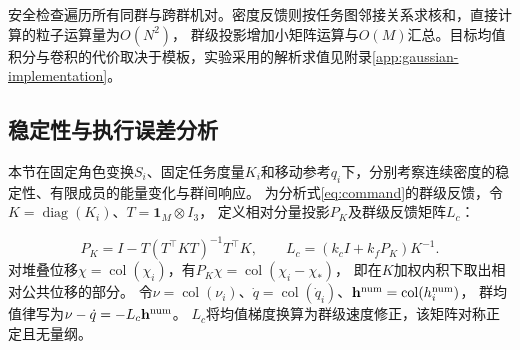\documentclass[UTF8,a4paper,11pt,fontset=none]{ctexart}
\newcommand{\diag}{\operatorname{diag}}\newcommand{\col}{\operatorname{col}}
\begin{document}
\begin{center}\end{center}
安全检查遍历所有同群与跨群机对。密度反馈则按任务图邻接关系求核和，直接计算的粒子运算量为$O(N^2)$，
群级投影增加小矩阵运算与$O(M)$汇总。目标均值积分与卷积的代价取决于模板，实验采用的解析求值见附录\ref{app:gaussian-implementation}。

\subsection{稳定性与执行误差分析}\label{sec:nominal-properties}\label{sec:execution-errors}\label{sec:formation-response}
本节在固定角色变换$S_i$、固定任务度量$K_i$和移动参考$q_i$下，分别考察连续密度的稳定性、有限成员的能量变化与群间响应。
为分析式\eqref{eq:command}的群级反馈，令$K=\diag(K_i)$、$T=\mathbf1_M\otimes I_3$，
定义相对分量投影$P_K$及群级反馈矩阵$L_c$：

\begin{equation}
P_K=I-T(T^\top KT)^{-1}T^\top K,\qquad
L_c=(k_cI+k_fP_K)K^{-1}.
\label{eq:mobility}
\end{equation}
对堆叠位移$\chi=\col(\chi_i)$，有$P_K\chi=\col(\chi_i-\chi_*)$，
即在$K$加权内积下取出相对公共位移的部分。
令$\nu=\col(\nu_i)$、$\dot q=\col(\dot q_i)$、$\mathbf h^{\rm num}=\col(h_i^{\rm num})$，
群均值律写为$\nu-\dot q=-L_c\mathbf h^{\rm num}$。
$L_c$将均值梯度换算为群级速度修正，该矩阵对称正定且无量纲。
\end{document}
